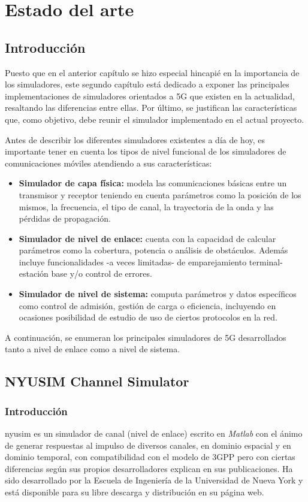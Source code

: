 \chapter{Estado del arte}\label{cap.estado del arte}

\section{Introducción}

Puesto que en el anterior capítulo se hizo especial hincapié en la importancia de los simuladores, este segundo capítulo está dedicado a exponer las principales implementaciones de simuladores orientados a 5G que existen en la actualidad, resaltando las diferencias entre ellas. Por último, se justifican las características que, como objetivo, debe reunir el simulador implementado en el actual proyecto.

Antes de describir los diferentes simuladores existentes a día de hoy, es importante tener en cuenta los tipos de nivel funcional de los simuladores de comunicaciones móviles atendiendo a sus características:
\begin{itemize}
    \item \textbf{Simulador de capa física:} modela las comunicaciones básicas entre un transmisor y receptor teniendo en cuenta parámetros como la posición de los mismos, la frecuencia, el tipo de canal, la trayectoria de la onda y las pérdidas de propagación.
    \item \textbf{Simulador de nivel de enlace:} cuenta con la capacidad de calcular parámetros como la cobertura, potencia o análisis de obstáculos. Además incluye funcionalidades -a veces limitadas- de emparejamiento terminal-estación base y/o control de errores.
    \item \textbf{Simulador de nivel de sistema:} computa parámetros y datos específicos como control de admisión, gestión de carga o eficiencia, incluyendo en ocasiones posibilidad de estudio de uso de ciertos protocolos en la red.
\end{itemize}

A continuación, se enumeran los principales simuladores de 5G desarrollados tanto a nivel de enlace como a nivel de sistema.

\section{NYUSIM Channel Simulator}
\subsection{Introducción}
\ac{nyusim} \cite{nyusim} es un simulador de canal (nivel de enlace) escrito en \textit{Matlab} con el ánimo de generar respuestas al impulso de diversos canales, en dominio espacial y en dominio temporal, con compatibilidad con el modelo de 3GPP pero con ciertas diferencias según sus propios desarrolladores explican en sus publicaciones. Ha sido desarrollado por la Escuela de Ingeniería de la Universidad de Nueva York y está disponible para su libre descarga y distribución en su página web.

